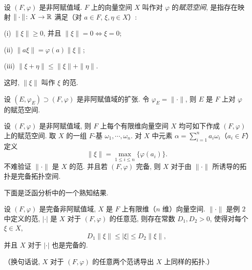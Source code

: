 \begin{definition}\label{def:ch8-2}
设 $(F,\varphi)$ 是非阿赋值域. $F$ 上的向量空间 $X$ 叫作对 $\varphi$ 的\emph{赋范空间}, 是指存在映射 $\|\cdot\|\colon X\to\mathbb{R}$ 满足（对 $a\in F$, $\xi,\eta\in X$）:

(i) $\|\xi\|\geqslant 0$, 并且 $\|\xi\|=0\Leftrightarrow\xi=0$;

(ii) $\|a\xi\|=\varphi(a)\|\xi\|$;

(iii) $\|\xi+\eta\|\leqslant\|\xi\|+\|\eta\|$.

这时, $\|\xi\|$ 叫作 $\xi$ 的范.
\end{definition}

\begin{example}
设 $(E,\varphi_E)\supset(F,\varphi)$ 是非阿赋值域的扩张. 令 $\varphi_E=\|\cdot\|$, 则 $E$ 是 $F$ 上对 $\varphi$ 的赋范空间.
\end{example}

\begin{example}
设 $(F,\varphi)$ 是非阿赋值域, 则 $F$ 上每个有限维向量空间 $X$ 均可如下作成 $(F,\varphi)$ 上的赋范空间. 取 $X$ 的一组 $F$-基 $\omega_1,\cdots,\omega_n$. 对 $X$ 中元素 $\alpha=\sum_{i=1}^{n}a_i\omega_i$（$a_i\in F$）定义
\[
  \|\xi\|=\max_{1\leqslant i\leqslant n}\{\varphi(a_i)\}.
\]
不难验证 $\|\cdot\|$ 是 $X$ 的范. 并且若 $(F,\varphi)$ 完备, 则 $X$ 对于由 $\|\cdot\|$ 所诱导的拓扑是完备拓扑空间.
\end{example}

下面是泛函分析中的一个熟知结果.

\begin{lemma}\label{lem:ch8-2}
设 $(F,\varphi)$ 是完备非阿赋值域, $X$ 是 $F$ 上有限维（$n$ 维）向量空间. $\|\cdot\|$ 是例 $2$ 中定义的范, $|\cdot|$ 是 $X$ 对于 $(F,\varphi)$ 的任意范, 则存在常数 $D_1,D_2>0$, 使得对每个 $\xi\in X$,
\[
  D_1\|\xi\|\leqslant|\xi|\leqslant D_2\|\xi\|,
\]
并且 $X$ 对于 $|\cdot|$ 也是完备的.

（换句话说, $X$ 对于 $(F,\varphi)$ 的任意两个范诱导出 $X$ 上同样的拓扑.）
\end{lemma}

